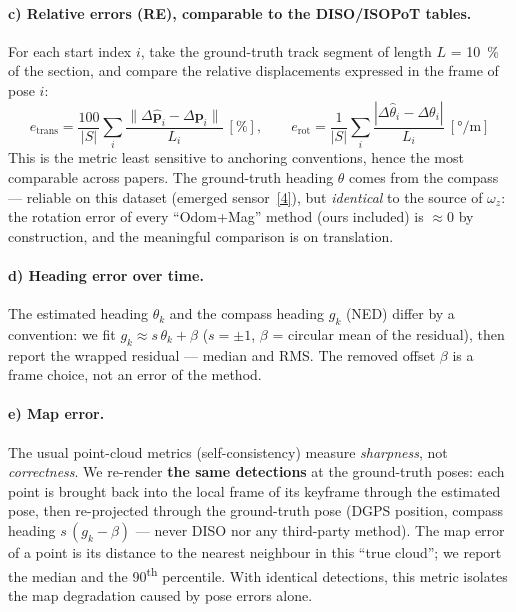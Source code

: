 \paragraph{c) Relative errors (RE), comparable to the DISO/ISOPoT tables.} For each
start index $i$, take the ground-truth track segment of length $L$ = 10~\% of the
section, and compare the relative displacements expressed in the frame of pose $i$:
\begin{equation}
e_{\text{trans}} = \frac{100}{|S|} \sum_{i}
\frac{\lVert \Delta\hat{\mathbf{p}}_i - \Delta\mathbf{p}_i \rVert}{L_i}\ [\%],
\qquad
e_{\text{rot}} = \frac{1}{|S|} \sum_{i}
\frac{|\Delta\hat\theta_i - \Delta\theta_i|}{L_i}\ [°/\text{m}]
\end{equation}
This is the metric least sensitive to anchoring conventions, hence the most
comparable across papers. The ground-truth heading $\theta$ comes from the compass —
reliable on this dataset (emerged sensor~\hyperref[bib:isopot]{[4]}), but \emph{identical} to the source of
$\omega_z$: the rotation error of every ``Odom+Mag'' method (ours included) is
$\approx 0$ by construction, and the meaningful comparison is on translation.

\paragraph{d) Heading error over time.} The estimated heading $\theta_k$ and the
compass heading $g_k$ (NED) differ by a convention: we fit
$g_k \approx s\,\theta_k + \beta$ ($s = \pm 1$, $\beta$ = circular mean of the
residual), then report the wrapped residual — median and RMS. The removed offset
$\beta$ is a frame choice, not an error of the method.

\paragraph{e) Map error.} The usual point-cloud metrics (self-consistency) measure
\emph{sharpness}, not \emph{correctness}. We re-render \textbf{the same detections}
at the ground-truth poses: each point is brought back into the local frame of its
keyframe through the estimated pose, then re-projected through the ground-truth pose
(DGPS position, compass heading $s\,(g_k - \beta)$ — never DISO nor any third-party
method). The map error of a point is its distance to the nearest neighbour in this
``true cloud''; we report the median and the 90\textsuperscript{th} percentile. With
identical detections, this metric isolates the map degradation caused by pose errors
alone.

